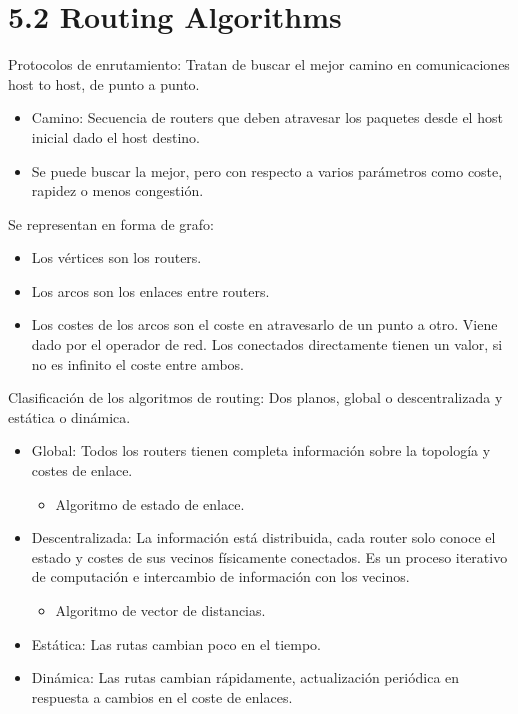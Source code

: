 \documentclass[12pt, twoside, openright]{report} %
\begin{document}
	
\section{5.2 Routing Algorithms}

    Protocolos de enrutamiento: Tratan de buscar el mejor camino en
    comunicaciones host to host, de punto a punto.

    \begin{itemize}
    \item
      Camino: Secuencia de routers que deben atravesar los paquetes
      desde el host inicial dado el host destino.
    \item
      Se puede buscar la mejor, pero con respecto a varios parámetros
      como coste, rapidez o menos congestión.
    \end{itemize}

	Se representan en forma de grafo:

    \begin{itemize}
    \item
      Los vértices son los routers.
    \item
      Los arcos son los enlaces entre routers.
    \item
      Los costes de los arcos son el coste en atravesarlo de un punto a
      otro. Viene dado por el operador de red. Los conectados
      directamente tienen un valor, si no es infinito el coste entre
      ambos.
    \end{itemize}

	Clasificación de los algoritmos de routing: Dos planos, global o
    descentralizada y estática o dinámica.

    \begin{itemize}
    \item
      Global: Todos los routers tienen completa información sobre la
      topología y costes de enlace.

      \begin{itemize}
      \item
        Algoritmo de estado de enlace.
      \end{itemize}
    \item
      Descentralizada: La información está distribuida, cada router solo
      conoce el estado y costes de sus vecinos físicamente conectados.
      Es un proceso iterativo de computación e intercambio de
      información con los vecinos.

      \begin{itemize}
      \item
        Algoritmo de vector de distancias.
      \end{itemize}
    \item
      Estática: Las rutas cambian poco en el tiempo.
    \item
      Dinámica: Las rutas cambian rápidamente, actualización periódica
      en respuesta a cambios en el coste de enlaces.
    \end{itemize}
\end{document}
